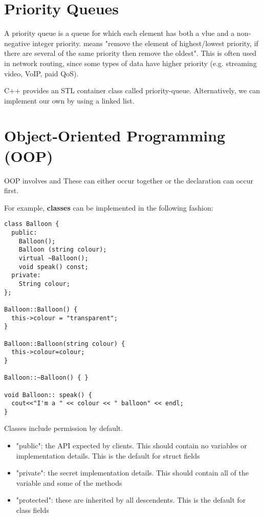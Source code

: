 \documentclass[12pt]{article}
\begin{document}
\section*{Priority Queues}
A priority queue is a queue for which each element has both a vlue and a non-negative integer priority.  means "remove the element of highest/lowest priority, if there are several of the same priority then remove the oldest". This is often used in network routing, since some types of data have higher priority (e.g. streaming video, VoIP, paid QoS).

C++ provides an STL container class called priority-queue. Alternatively, we can implement our own by using a linked list.

\section*{Object-Oriented Programming (OOP)}
OOP involves  and  These can either occur together or the declaration can occur first.

For example, {\bf classes} can be implemented in the following fashion:

\begin{verbatim}
class Balloon {
  public:
    Balloon();
    Balloon (string colour);
    virtual ~Balloon();
    void speak() const;
  private:
    String colour;
};

Balloon::Balloon() {
  this->colour = "transparent";
}

Balloon::Balloon(string colour) {
  this->colour=colour;
}

Balloon::~Balloon() { }

void Balloon:: speak() {
  cout<<"I'm a " << colour << " balloon" << endl;
}
\end{verbatim}

Classes include permission by default.
\begin{itemize}
\item "public": the API expected by clients. This should contain no variables or implementation details. This is the default for struct fields
\item "private": the secret implementation details. This should contain all of the variable and some of the methods
\item "protected": these are inherited by all descendents. This is the default for class fields
\end{itemize}
\end{document}

